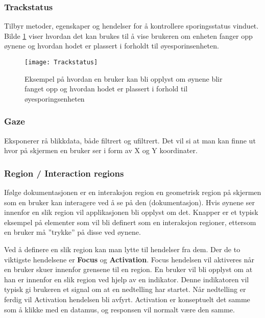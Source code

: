 \subsubsection{Trackstatus}
Tilbyr metoder, egenskaper og hendelser for å kontrollere sporingsstatus vinduet. Bilde \ref{fig:track} viser hvordan det kan brukes til å vise brukeren om enheten fanger opp øynene og hvordan hodet er plassert i forholdt til øyesporinsenheten.

\begin{figure}[ht!]
\centering
\texttt{[image: Trackstatus]}
\caption{Eksempel på hvordan en bruker kan bli opplyst om øynene blir fanget opp og hvordan hodet er plassert i forhold til øyesporingsenheten}
\label{fig:track}
\end{figure}

\subsubsection{Gaze}
Eksponerer rå blikkdata, både filtrert og ufiltrert. Det vil si at man kan finne ut hvor på skjermen en bruker ser i form av X og Y koordinater.  


\subsubsection{Region / Interaction regions}

Ifølge dokumentasjonen er en interaksjon region en geometrisk region på skjermen som en bruker kan interagere ved å se på den (dokumentasjon). Hvis øynene ser innenfor en slik region vil applikasjonen bli opplyst om det. Knapper er et typisk eksempel på elementer som vil bli definert som en interaksjon regioner, ettersom en bruker må ”trykke” på disse ved øynene. 

Ved å definere en slik region kan man lytte til hendelser fra dem. Der de to viktigste hendelsene er \textbf{Focus} og \textbf{Activation}. Focus hendelsen vil aktiveres når en bruker skuer innenfor grensene til en region. En bruker vil bli opplyst om at han er innenfor en slik region ved hjelp av en indikator. Denne indikatoren vil typisk gi brukeren et signal om at en nedtelling har startet. Når nedtelling er ferdig vil Activation hendelsen bli avfyrt. Activation er konseptuelt det samme som å klikke med en datamus, og responsen vil normalt være den samme.  




